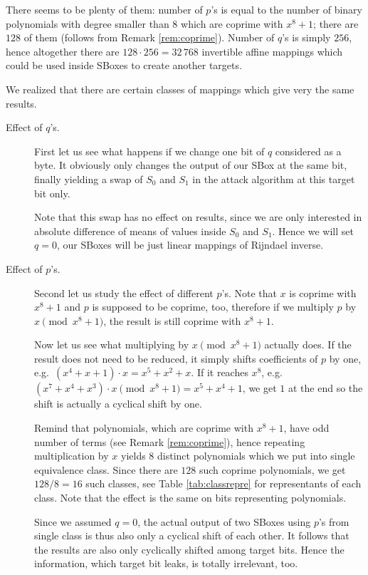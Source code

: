 There seems to be plenty of them: number of $p$'s is equal to the number of binary polynomials with degree smaller than $8$ which are coprime with $x^8+1$; there are $128$ of them (follows from Remark \ref{rem:coprime}). Number of $q$'s is simply $256$, hence altogether there are $128\cdot 256 = 32\,768$ invertible affine mappings which could be used inside SBoxes to create another targets.

\begin{remark}
\label{rem:pqeffect}
	We realized that there are certain classes of mappings which give very the same results.
	\begin{description}
		\item[Effect of $q$'s.]
			First let us see what happens if we change one bit of $q$ considered as a byte. It obviously only changes the output of our SBox at the same bit, finally yielding a swap of $S_0$ and $S_1$ in the attack algorithm at this target bit only.
			
			Note that this swap has no effect on results, since we are only interested in absolute difference of means of values inside $S_0$ and $S_1$. Hence we will set $q = 0$, our SBoxes will be just linear mappings of Rijndael inverse.
		
		\item[Effect of $p$'s.]
			Second let us study the effect of different $p$'s. Note that $x$ is coprime with $x^8+1$ and $p$ is supposed to be coprime, too, therefore if we multiply $p$ by $x\pmod{x^8+1}$, the result is still coprime with $x^8+1$.
			
			Now let us see what multiplying by $x\pmod{x^8+1}$ actually does. If the result does not need to be reduced, it simply shifts coefficients of $p$ by one, e.g.\ $(x^4 + x + 1) \cdot x = x^5 + x^2 + x$. If it reaches $x^8$, e.g.\ $(x^7 + x^4 + x^3) \cdot x \pmod{x^8+1} = x^5 + x^4 + 1$, we get $1$ at the end so the shift is actually a cyclical shift by one.
			
			Remind that polynomials, which are coprime with $x^8+1$, have odd number of terms (see Remark \ref{rem:coprime}), hence repeating multiplication by $x$ yields $8$ distinct polynomials which we put into single equivalence class. Since there are $128$ such coprime polynomials, we get $128/8=16$ such classes, see Table \ref{tab:classrepre} for representants of each class. Note that the effect is the same on bits representing polynomials.
			
			Since we assumed $q = 0$, the actual output of two SBoxes using $p$'s from single class is thus also only a cyclical shift of each other. It follows that the results are also only cyclically shifted among target bits. Hence the information, which target bit leaks, is totally irrelevant, too.
	\end{description}
\end{remark}

